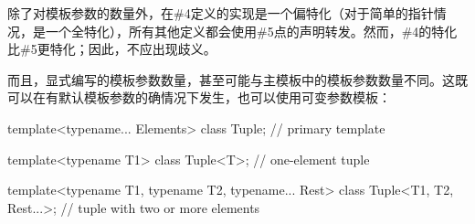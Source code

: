 除了对模板参数的数量外，在\#4定义的实现是一个偏特化（对于简单的指针情况，是一个全特化），所有其他定义都会使用\#5点的声明转发。然而，\#4的特化比\#5更特化；因此，不应出现歧义。

而且，显式编写的模板参数数量，甚至可能与主模板中的模板参数数量不同。这既可以在有默认模板参数的确情况下发生，也可以使用可变参数模板：

\begin{cpp}
template<typename... Elements>
class Tuple; // primary template

template<typename T1>
class Tuple<T>; // one-element tuple

template<typename T1, typename T2, typename... Rest>
class Tuple<T1, T2, Rest...>; // tuple with two or more elements
\end{cpp}


















